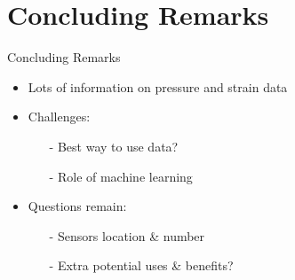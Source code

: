 \documentclass[aspectratio=169]{beamer}            %
\begin{document}
\section{Concluding Remarks}
\begin{frame}{Concluding Remarks}

  \pause
  \begin{itemize}[<+->]
    \item{Lots of information on pressure and strain data}
    \item{Challenges:}
		\begin{itemize}[<+->]
		  \item[-]{Best way to use data?}
			\item[-]{Role of machine learning}
		\end{itemize}
		\item{Questions remain:}
		\begin{itemize}[<+->]
		  \item[-]{Sensors location \& number}
			\item[-]{Extra potential uses \& benefits?}
		\end{itemize}
  \end{itemize}
	  
\end{frame}

\end{document}
